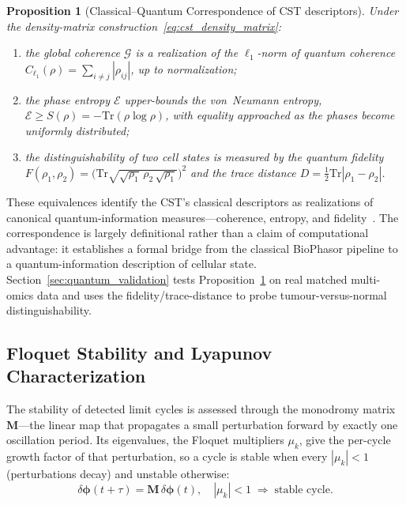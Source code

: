 \documentclass[preprint,12pt,amsmath,amssymb,superscriptaddress,floatfix]{revtex4-2}
\newtheorem{proposition}{Proposition}[section]
\begin{document}
\begin{proposition}[Classical--Quantum Correspondence of CST descriptors]
\label{prop:cst_cq}
Under the density-matrix construction~\eqref{eq:cst_density_matrix}:
\begin{enumerate}
  \item the global coherence $\mathcal{G}$ is a realization of the
        $\ell_1$-norm of quantum coherence
        $C_{\ell_1}(\rho)=\sum_{i\neq j}|\rho_{ij}|$, up to normalization;
  \item the phase entropy $\mathcal{E}$ upper-bounds the von~Neumann entropy,
        $\mathcal{E} \ge S(\rho) = -\mathrm{Tr}(\rho\log\rho)$, with equality
        approached as the phases become uniformly distributed;
  \item the distinguishability of two cell states is measured by the quantum
        fidelity $F(\rho_1,\rho_2)=\bigl(\mathrm{Tr}\sqrt{\sqrt{\rho_1}\,\rho_2\,
        \sqrt{\rho_1}}\bigr)^2$ and the trace distance
        $D=\tfrac12\mathrm{Tr}|\rho_1-\rho_2|$.
\end{enumerate}
\end{proposition}

\noindent
These equivalences identify the CST's classical descriptors as realizations of
canonical quantum-information measures---coherence, entropy, and
fidelity~\cite{biamonte2017quantum}. The correspondence is largely definitional
rather than a claim of computational advantage: it establishes a formal bridge
from the classical BioPhasor pipeline to a quantum-information description of
cellular state. Section~\ref{sec:quantum_validation} tests
Proposition~\ref{prop:cst_cq} on real matched multi-omics data and uses the
fidelity/trace-distance to probe tumour-versus-normal distinguishability.

\subsection{Floquet Stability and Lyapunov Characterization}

The stability of detected limit cycles is assessed through the
monodromy matrix $\mathbf{M}$---the linear map that propagates a small
perturbation forward by exactly one oscillation period. Its eigenvalues,
the Floquet multipliers $\mu_k$, give the per-cycle growth factor of that
perturbation, so a cycle is stable when every $|\mu_k|<1$ (perturbations
decay) and unstable otherwise:
\begin{equation}
    \delta\boldsymbol{\phi}(t+\tau) =
    \mathbf{M}\,\delta\boldsymbol{\phi}(t), \quad
    |\mu_k| < 1 \;\Rightarrow\; \text{stable cycle}.
    \label{eq:floquet}
\end{equation}
\end{document}
